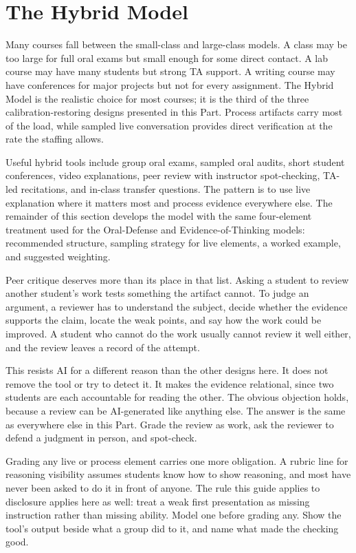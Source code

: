 \documentclass{SIAMbook2023}
\begin{document}
\section{The Hybrid Model}
\label{i:sec:hybrid-model}%

Many courses fall between the small-class and large-class models. A class may be too large for full oral exams but small enough for some direct contact. A lab course may have many students but strong TA support. A writing course may have conferences for major projects but not for every assignment. The Hybrid Model is the realistic choice for most courses; it is the third of the three calibration-restoring designs presented in this Part. Process artifacts carry most of the load, while sampled live conversation provides direct verification at the rate the staffing allows.

Useful hybrid tools include group oral exams, sampled oral audits, short student conferences, video explanations, peer review with instructor spot-checking, TA-led recitations, and in-class transfer questions. The pattern is to use live explanation where it matters most and process evidence everywhere else. The remainder of this section develops the model with the same four-element treatment used for the Oral-Defense and Evidence-of-Thinking models: recommended structure, sampling strategy for live elements, a worked example, and suggested weighting.

Peer critique deserves more than its place in that list. Asking a student to review another student's work tests something the artifact cannot. To judge an argument, a reviewer has to understand the subject, decide whether the evidence supports the claim, locate the weak points, and say how the work could be improved. A student who cannot do the work usually cannot review it well either, and the review leaves a record of the attempt.

This resists AI for a different reason than the other designs here. It does not remove the tool or try to detect it. It makes the evidence relational, since two students are each accountable for reading the other. The obvious objection holds, because a review can be AI-generated like anything else. The answer is the same as everywhere else in this Part. Grade the review as work, ask the reviewer to defend a judgment in person, and spot-check.

Grading any live or process element carries one more obligation. A rubric line for reasoning visibility assumes students know how to show reasoning, and most have never been asked to do it in front of anyone. The rule this guide applies to disclosure applies here as well: treat a weak first presentation as missing instruction rather than missing ability. Model one before grading any. Show the tool's output beside what a group did to it, and name what made the checking good.
\end{document}
